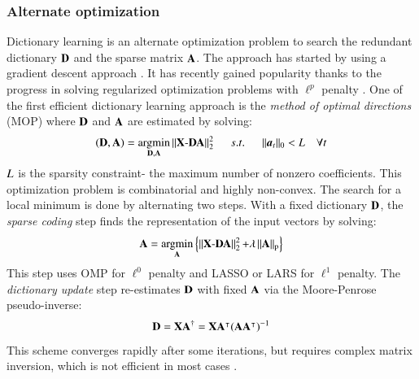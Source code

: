 \subsubsection{Alternate optimization}
Dictionary learning is an alternate optimization problem to search the redundant dictionary $ \mathbf{D} $ and the sparse matrix $ \mathbf{A} $. The approach has started by using a gradient descent approach \citep{olshausen1996emergence}. It has recently gained popularity thanks to the progress in solving regularized optimization problems with $ \ell^p $ penalty \citep{tibshirani1996regression, donoho2003optimally, efron2004least, donoho2012sparse}. One of the first efficient dictionary learning approach is the \textit{method of optimal directions} (MOP) \citep{engan1999method} where $ \mathbf{D} $ and $ \mathbf{A} $ are estimated by solving:
\begin{equation}
(\mathbf{D}, \mathbf{A}) = \operatorname*{\arg\!\min}_{\mathbf{D}, \mathbf{A}} \operatorname{\Arrowvert \mathit{\mathbf{X} - \mathbf{D} \mathbf{A}} \Arrowvert^2_2 } \:\:\:\:\:\: s.t. \:\:\:\:\:\: \operatorname{\Arrowvert \mathit{\boldsymbol{a}_t} \Arrowvert_0 } < L \quad \forall t
\end{equation}
$ L $ is the sparsity constraint- the maximum number of nonzero coefficients. This optimization problem is  combinatorial and highly non-convex. The search for a local minimum is done by alternating two steps. With a fixed dictionary $ \mathbf{D} $, the \textit{sparse coding} step finds the representation of the input vectors by solving:
\begin{equation}
\mathbf{A} = \operatorname*{\arg\!\min}_{\mathbf{A}} \left\lbrace \operatorname{\Arrowvert \mathit{\mathbf{X} - \mathbf{D}\mathbf{A}} \Arrowvert^2_2 } + \lambda \operatorname{\Arrowvert \mathit{\mathbf{A}} \Arrowvert_p }\right\rbrace
\end{equation}
This step uses OMP for $ \ell^0 $ penalty and LASSO or LARS for $ \ell^1 $ penalty. The \textit{dictionary update} step re-estimates $ \mathbf{D} $ with fixed $ \mathbf{A} $ via the Moore-Penrose pseudo-inverse:
\begin{equation}
\mathbf{D} = \mathbf{X} \mathbf{A}^\dagger = \mathbf{X} \mathbf{A}^\intercal (\mathbf{A} \mathbf{A}^\intercal)^{-1}
\end{equation}
This scheme converges rapidly after some iterations, but requires complex matrix inversion, which is not efficient in most cases \citep{aharon2006ksvd}. 
